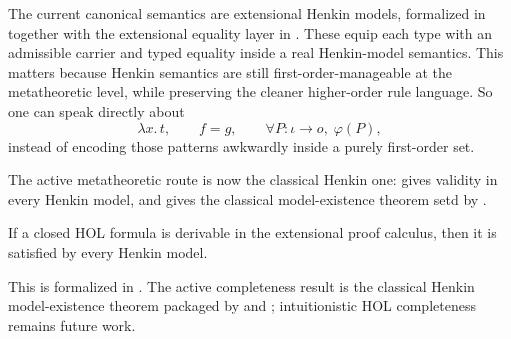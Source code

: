 \documentclass[11pt,openany]{report}
\begin{document}
The current canonical semantics are extensional Henkin models, formalized in
 together with the
extensional equality layer in
.
These equip each type with an admissible carrier and typed equality inside a
real Henkin-model semantics.  This matters because Henkin semantics are still
first-order-manageable at the metatheoretic level, while preserving the
cleaner higher-order rule language.
So one can speak directly about
\[
  \lambda x.\, t,\qquad f = g,\qquad \forall P : \iota \to o,\; \varphi(P),
\]
instead of encoding those patterns awkwardly inside a purely first-order
set.

The active metatheoretic route is now the classical Henkin one:
 gives validity in every Henkin
model, and
 gives the
classical model-existence theorem setd by
.

\begin{theorem}
If a closed HOL formula is derivable in the extensional proof calculus, then
it is satisfied by every Henkin model.
\end{theorem}

This is formalized in
.
The active completeness result is the classical Henkin model-existence theorem
packaged by  and
;
intuitionistic HOL completeness remains future work.
\end{document}
